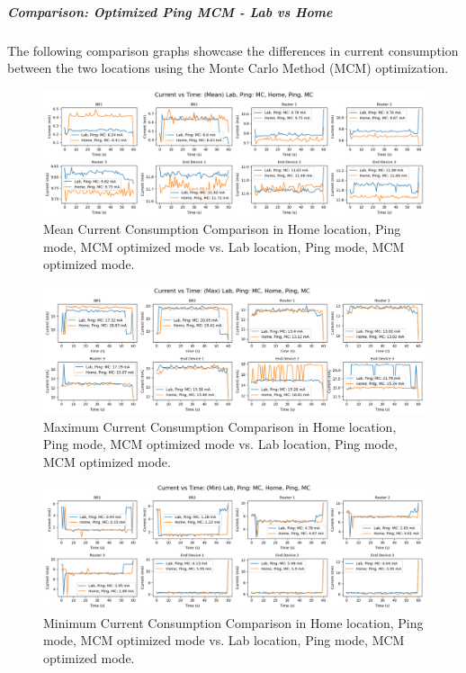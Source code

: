 \subparagraph{Comparison: Optimized Ping MCM - Lab vs Home}
The following comparison graphs showcase the differences in current consumption between the two locations using the Monte Carlo Method (MCM) optimization.

\begin{figure}[H]
  \centering
  \includegraphics[width=1\textwidth]{images/research_results/current_consumption_analysis/optimized/home/ping/mc/comparison/mean_comparison_home_ping_mc_vs_lab_ping_mc.png}
    \caption{Mean Current Consumption Comparison in Home location, Ping mode, MCM optimized mode vs. Lab location, Ping mode, MCM optimized mode.}
    \label{fig:mean_comparison_home_ping_mc_vs_lab_ping_mc}
\end{figure}

\begin{figure}[H]
  \centering
  \includegraphics[width=1\textwidth]{images/research_results/current_consumption_analysis/optimized/home/ping/mc/comparison/max_comparison_home_ping_mc_vs_lab_ping_mc.png}
    \caption{Maximum Current Consumption Comparison in Home location, Ping mode, MCM optimized mode vs. Lab location, Ping mode, MCM optimized mode.}
    \label{fig:max_comparison_home_ping_mc_vs_lab_ping_mc}
\end{figure}

\begin{figure}[H]
  \centering
  \includegraphics[width=1\textwidth]{images/research_results/current_consumption_analysis/optimized/home/ping/mc/comparison/min_comparison_home_ping_mc_vs_lab_ping_mc.png}
    \caption{Minimum Current Consumption Comparison in Home location, Ping mode, MCM optimized mode vs. Lab location, Ping mode, MCM optimized mode.}
    \label{fig:min_comparison_home_ping_mc_vs_lab_ping_mc}
\end{figure}

